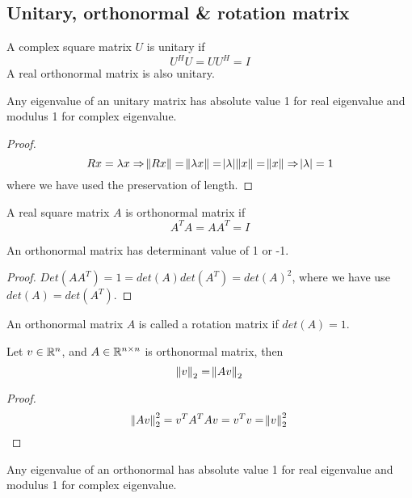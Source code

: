 \begin{refsection}
\begin{mdframed}
\end{mdframed}

\subsection{Unitary, orthonormal \& rotation matrix}
\begin{definition}
A complex square matrix $U$ is unitary if
$$U^HU=UU^H = I$$
A real orthonormal matrix is also unitary. 
\end{definition}

\begin{theorem}
Any eigenvalue of an unitary matrix has absolute value 1 for real eigenvalue and modulus 1 for complex eigenvalue.
\end{theorem}
\begin{proof}
$$Rx = \lambda x \Rightarrow \norm{Rx} = \norm{\lambda x} = \abs{\lambda}\norm{x} = \norm{x} \Rightarrow \abs{\lambda} = 1$$
where we have used the preservation of length.
\end{proof}



\begin{definition}
A real square matrix $A$  is orthonormal matrix if
$$A^TA = AA^T = I$$
\end{definition}


\begin{lemma}
An orthonormal matrix has determinant value of 1 or -1.
\end{lemma}
\begin{proof}
$Det(AA^T) = 1 = det(A)det(A^T)=det(A)^2$, where we have use $det(A)=det(A^T)$.	
\end{proof}


\begin{definition}
An orthonormal matrix $A$ is called a rotation matrix if $det(A)=1$.
\end{definition}

\begin{lemma}
Let $v\in \mathbb{R}^n$, and $A \in \mathbb{R}^{n\times n}$ is orthonormal matrix, then
$$\norm{v}_2 = \norm{Av}_2$$
\end{lemma}
\begin{proof}
$$\norm{Av}_2^2 = v^TA^TAv = v^Tv = \norm{v}^2_2$$
\end{proof}


\begin{theorem}
Any eigenvalue of an orthonormal has absolute value 1 for real eigenvalue and modulus 1 for complex eigenvalue.
\end{theorem}


\end{refsection}
